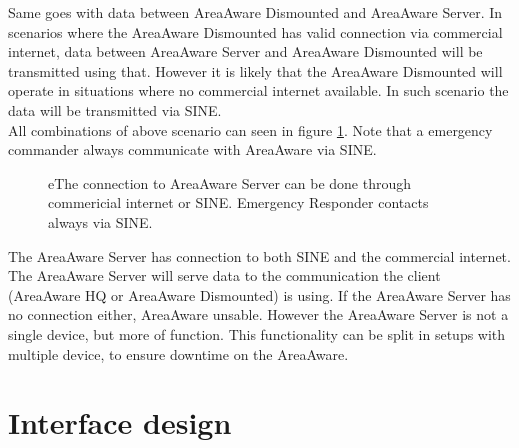 
\noindent Same goes with data between AreaAware Dismounted and AreaAware Server.
In scenarios where the AreaAware Dismounted has valid connection via commercial internet, data between AreaAware Server and AreaAware Dismounted will be transmitted using that.
However it is likely that the AreaAware Dismounted will operate in situations where no commercial internet available.
In such scenario the data will be transmitted via SINE.\\

\noindent All combinations of above scenario can seen in figure \ref{fig:ce}.
Note that a emergency commander always communicate with AreaAware via SINE.

    \begin{figure}[ht]
        \centering
        \quad\quad
        \quad\quad
        \caption{eThe connection to AreaAware Server can be done through commericial internet or SINE. Emergency Responder contacts always via SINE.}
        \label{fig:ce}
    \end{figure}



The AreaAware Server has connection to both SINE and the commercial internet.
The AreaAware Server will serve data to the communication the client (AreaAware HQ or AreaAware Dismounted) is using.
If the AreaAware Server has no connection either, AreaAware unsable.
However the AreaAware Server is not a single device, but more of function.
This functionality can be split in setups with multiple device, to ensure downtime on the AreaAware.


\section{Interface design}
\label{sec:arch_interface}

